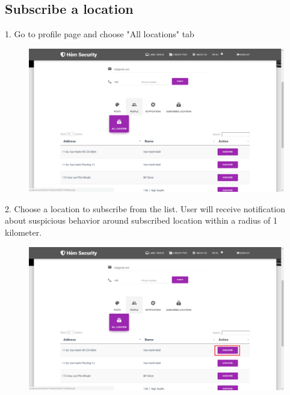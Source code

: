 \subsection{Subscribe a location}
1. Go to profile page and choose "All locations" tab
\begin{center}
    \begin{figure}[H]
    \centering
    \includegraphics[width=1\columnwidth]{images/chap6/instruction9.png}
    \end{figure}
\end{center}
2. Choose a location to subscribe from the list. User will receive notification about suspicious behavior around subscribed location within a radius of 1 kilometer.   
\begin{center}
    \begin{figure}[H]
    \centering
    \includegraphics[width=1\columnwidth]{images/chap6/instruction10.png}
    \end{figure}
\end{center}




